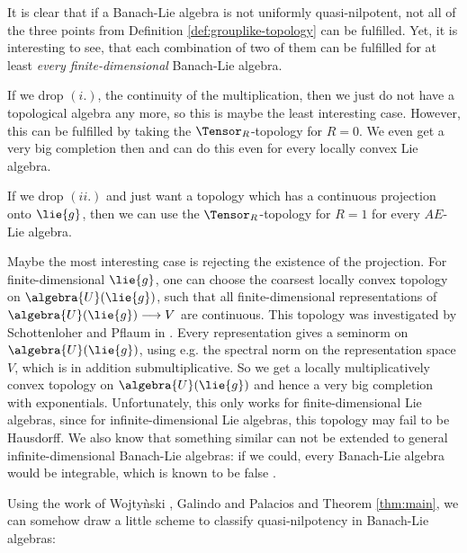 \documentclass[
11pt,                          %
english                        %
]{article}
\begin{document}
\begin{remark}
	It is clear that if a Banach-Lie algebra is not uniformly quasi-nilpotent,
	not all of the three points from Definition \ref{def:grouplike-topology} can be
	fulfilled. Yet, it is interesting to see, that each combination of two of them
	can be fulfilled for at least \emph{every finite-dimensional} Banach-Lie 
	algebra.
	\begin{remarklist}
		\item
		If we drop $(i.)$, the continuity of the multiplication, then we just do not
		have a topological algebra any more, so this is maybe the least interesting
		case. However, this can be fulfilled by taking the $\Tensor_R$-topology for 
		$R = 0$. We even get a very big completion then and can do this even for
		every locally convex Lie algebra.
		
		\item
		If we drop $(ii.)$ and just want a topology which has a continuous 
		projection onto $\lie{g}$, then we can use the $\Tensor_R$-topology for 
		$R = 1$ for every $AE$-Lie algebra.

		\item
		Maybe the most interesting case is rejecting the existence of the 
		projection. For finite-dimensional $\lie{g}$, one can choose 
		the coarsest locally convex topology on $\algebra{U}(\lie{g})$, such that all 
		finite-dimensional representations of $\algebra{U}(\lie{g}) 
		\longrightarrow V$ are continuous. This topology was investigated by
		Schottenloher and Pflaum in \cite{pflaum.schottenloher:1998a}.
		Every representation gives a seminorm on $\algebra{U}(\lie{g})$, using e.g.
		the spectral norm on the representation space $V$, which is in addition
		submultiplicative. So we get a locally multiplicatively convex topology
		on $\algebra{U}(\lie{g})$ and hence a very big completion with exponentials.
		Unfortunately, this only works for finite-dimensional Lie algebras, since for 
		infinite-dimensional Lie algebras, this topology may fail to be Hausdorff. We 
		also know that something similar can not be extended to general 
		infinite-dimensional Banach-Lie algebras: if we could, every Banach-Lie 
		algebra would be integrable, which is known to be false 
		\cite[Remark 1.14.15]{duistermaat.kolk:2000a}.
	\end{remarklist}
\end{remark}
Using the work of Wojty\`nski \cite{wojtynski:1998a}, Galindo and Palacios 
\cite{galindo.palacios:2012a} and Theorem \ref{thm:main}, we can somehow draw a 
little scheme to classify quasi-nilpotency in Banach-Lie algebras:
\end{document}
